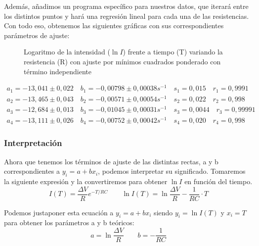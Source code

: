 \documentclass[12pt, a4paper, titlepage]{article}
\begin{document}
  Además, añadimos un programa específico para nuestros datos, que iterará entre los distintos puntos y hará una regresión lineal para cada una de las resistencias. Con todo eso, obtenemos las siguientes gráficas con sus correspondientes parámetros de ajuste:

  \begin{figure}[H]
    \hspace{0.2em} 
    \caption{Logaritmo de la intensidad ($\ln{I}$) frente a tiempo (T) variando la resistencia (R) con ajuste por mínimos cuadrados ponderado con término independiente}
  \end{figure}

  \begin{gather*}
    a_1 = -13,041 \pm 0,022 \quad b_1 = -0,00798 \pm 0,00038 s^{-1} \quad s_1 = 0,015 \quad r_1 = 0,9991 \\
    a_2 = -13,465 \pm 0,043 \quad b_2 = -0,00571 \pm 0,00054 s^{-1} \quad s_2 = 0,022 \quad r_2 = 0,998 \\
    a_3 = -12,684 \pm 0,013 \quad b_3 = -0,01045 \pm 0,00031 s^{-1} \quad s_3 = 0,0044 \quad r_3 = 0,99991 \\
    a_4 = -13,111 \pm 0,026 \quad b_4 = -0,00752 \pm 0,00042 s^{-1} \quad s_4 = 0,020 \quad r_4 = 0,998
  \end{gather*}

  \newpage
  \subsubsection{Interpretación}

  Ahora que tenemos los términos de ajuste de las distintas rectas, a y b correspondientes a $y_i = a + bx_i$, podemos interpretar su significado. Tomaremos la siguiente expresión y la convertiremos para obtener $\ln{I}$ en función del tiempo.
  \begin{equation}
    I(T) = \frac{\Delta V}{R} e^{-T/RC} \qquad \ln{I(T)} = \ln{\frac{\Delta V}{R}} - \frac{1}{RC} \cdot T \label{ec:I}
  \end{equation}

  Podemos justaponer esta ecuación a $y_i = a + bx_i$ siendo $y_i = \ln{I(T)}$ y $x_i = T$ para obtener los parámetros a y b teóricos:
  \begin{equation}
    a = \ln{\frac{\Delta V}{R}} \qquad b = - \frac{1}{RC} \label{ec:abteo}
  \end{equation}
\end{document}
